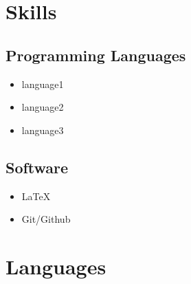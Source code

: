 \documentclass[11pt]{article}
\begin{document}
\section{Skills}
\begin{multicols}{2}
    \subsection{Programming Languages}
    \begin{itemize}
      \item language1
      \item language2
      \item language3
    \end{itemize}
    \subsection{Software}
        \begin{itemize}
            \item \LaTeX
            \item Git/Github
        \end{itemize}
\end{multicols}

\section{Languages}
\end{document}
